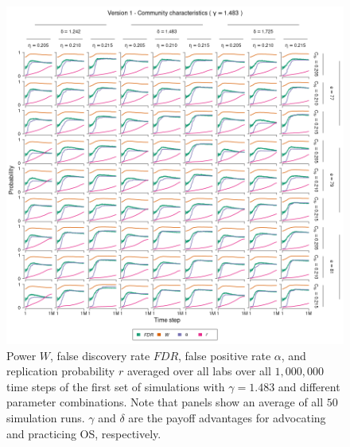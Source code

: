 \documentclass[meta, authordate]{jote-new-article}
\begin{document}
\begin{figure}
  \begin{fullwidth}
    \centering
    \includegraphics[width=\textwidth]{v1_cha_plot_sens_payypro1.483.png}
    \caption{Power $W$, false discovery rate $FDR$, false positive rate $\alpha$, and replication probability $r$ averaged over all labs over all $1,000,000$ time steps of the first set of simulations with $\gamma=1.483$ and different parameter combinations. Note that panels show an average of all $50$ simulation runs. $\gamma$ and $\delta$ are the payoff advantages for advocating and practicing OS, respectively.}
    \label{fig:v1_cha_plot_sens_payypro1.483}
  \end{fullwidth}
\end{figure}
%
%
\end{document}
